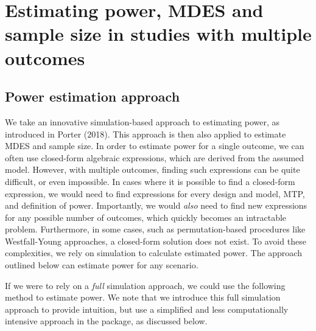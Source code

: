 \documentclass[
]{article}
\begin{document}
\section{Estimating power, MDES and sample size in studies with multiple outcomes}
\label{sec:est}

\subsection{Power estimation approach}
\label{sec:est_power}

We take an innovative simulation-based approach to estimating power, as
introduced in Porter (2018). This approach is then also applied to
estimate MDES and sample size. In order to estimate power for a single
outcome, we can often use closed-form algebraic expressions, which are
derived from the assumed model. However, with multiple outcomes, finding
such expressions can be quite difficult, or even impossible. In cases
where it is possible to find a closed-form expression, we would need to
find expressions for every design and model, MTP, and definition of
power. Importantly, we would \emph{also} need to find new expressions
for any possible number of outcomes, which quickly becomes an
intractable problem. Furthermore, in some cases, such as
permutation-based procedures like Westfall-Young approaches, a
closed-form solution does not exist. To avoid these complexities, we
rely on simulation to calculate estimated power. The approach outlined
below can estimate power for any scenario.

If we were to rely on a \emph{full} simulation approach, we could use
the following method to estimate power. We note that we introduce this
full simulation approach to provide intuition, but use a simplified and
less computationally intensive approach in the package, as discussed
below.
\end{document}
